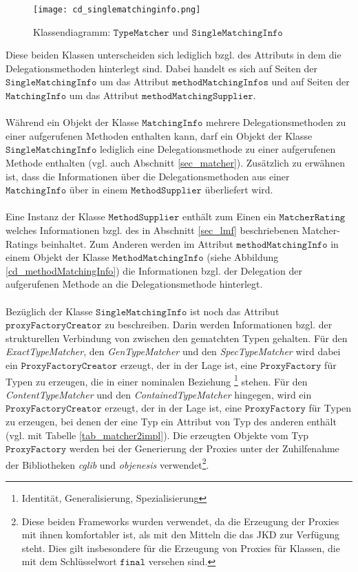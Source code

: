 \begin{figure}[h!]
\texttt{[image: cd\_singlematchinginfo.png]}
\caption{Klassendiagramm: $\texttt{TypeMatcher}$ und $\texttt{SingleMatchingInfo}$}
\label{fig_cdSingleMatchingInfo}
\end{figure}
\noindent
Diese beiden Klassen unterscheiden sich lediglich bzgl. des Attributs in dem die Delegationsmethoden hinterlegt sind. Dabei handelt es sich auf Seiten der $\texttt{SingleMatchingInfo}$ um das Attribut $\texttt{methodMatchingInfos}$ und auf Seiten der $\texttt{MatchingInfo}$ um das Attribut $\texttt{methodMatchingSupplier}$. 
\\\\
Während ein Objekt der Klasse $\texttt{MatchingInfo}$ mehrere Delegationsmethoden zu einer aufgerufenen Methoden enthalten kann, darf ein Objekt der Klasse $\texttt{SingleMatchingInfo}$ lediglich eine Delegationsmethode zu einer aufgerufenen Methode enthalten (vgl. auch Abschnitt \ref{sec_matcher}). Zusätzlich zu erwähnen ist, dass die Informationen über die Delegationsmethoden aus einer $\texttt{MatchingInfo}$ über in einem $\texttt{MethodSupplier}$ überliefert wird.
\\\\
Eine Instanz der Klasse $\texttt{MethodSupplier}$ enthält zum Einen ein $\texttt{MatcherRating}$ welches Informationen bzgl. des in Abschnitt \ref{sec_lmf} beschriebenen Matcher-Ratings beinhaltet. Zum Anderen werden im Attribut $\texttt{methodMatchingInfo}$ in einem Objekt der Klasse $\texttt{MethodMatchingInfo}$ (siehe Abbildung \ref{cd_methodMatchingInfo}) die Informationen bzgl. der Delegation der aufgerufenen Methode an die Delegationsmethode hinterlegt. 
\\\\
Bezüglich der Klasse $\texttt{SingleMatchingInfo}$ ist noch das Attribut $\texttt{proxyFactoryCreator}$ zu beschreiben. Darin werden Informationen bzgl. der strukturellen Verbindung von zwischen den gematchten Typen gehalten. Für den \emph{ExactTypeMatcher}, den \emph{GenTypeMatcher} und den \emph{SpecTypeMatcher} wird dabei ein $\texttt{ProxyFactoryCreator}$ erzeugt, der in der Lage ist, eine $\texttt{ProxyFactory}$ für Typen zu erzeugen, die in einer nominalen Beziehung \footnote{Identität, Generalisierung, Spezialisierung} stehen. Für den \emph{ContentTypeMatcher} und den \emph{ContainedTypeMatcher} hingegen, wird ein $\texttt{ProxyFactoryCreator}$ erzeugt, der in der Lage ist, eine $\texttt{ProxyFactory}$ für Typen zu erzeugen, bei denen der eine Typ ein Attribut von Typ des anderen enthält (vgl. mit Tabelle \ref{tab_matcher2impl}). Die erzeugten Objekte vom Typ $\texttt{ProxyFactory}$ werden bei der Generierung der Proxies unter der Zuhilfenahme der Bibliotheken \emph{cglib} und \emph{objenesis} verwendet\footnote{Diese beiden Frameworks wurden verwendet, da die Erzeugung der Proxies mit ihnen komfortabler ist, als mit den Mitteln die das JKD zur Verfügung steht. Dies gilt insbesondere für die Erzeugung von Proxies für Klassen, die mit dem Schlüsselwort $\texttt{final}$ versehen sind.}.
